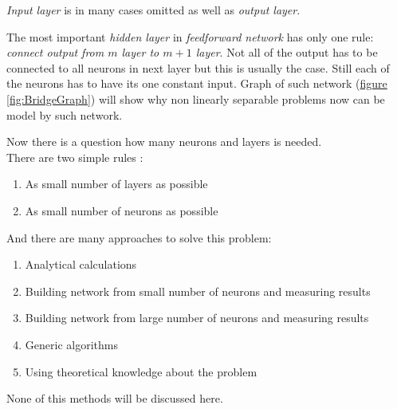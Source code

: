 \textit{Input layer} is in many cases omitted as well as \textit{output layer}.

The most important \textit{hidden layer} in \textit{feedforward network} has only one rule: \textit{connect output from $m$ layer to $m+1$ layer}. Not all of the output has to be connected to all neurons in next layer but this is usually the case. Still each of the neurons has to have its one constant input. Graph of such network (\hyperref[fig:BridgeGraph]{figure \ref{fig:BridgeGraph}}) will show why non linearly separable problems now can be model by such network.

\newpage
Now there is a question how many neurons and layers is needed. \\ There are two simple rules \cite{mlpPawelRosczak}:
\begin{enumerate}[topsep=8pt,itemsep=-1ex,partopsep=1ex,parsep=1ex]
    \item As small number of layers as possible
    \item As small number of neurons as possible
\end{enumerate}
And there are many approaches to solve this problem:
\begin{enumerate}[topsep=8pt,itemsep=-1ex,partopsep=1ex,parsep=1ex]
    \item Analytical calculations
    \item Building network from small number of neurons and measuring results
    \item Building network from large number of neurons and measuring results
    \item Generic algorithms
    \item Using theoretical knowledge about the problem
\end{enumerate}
None of this methods will be discussed here.

